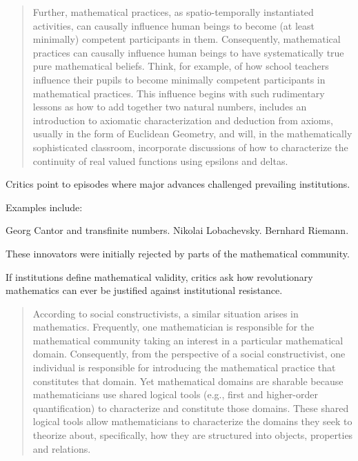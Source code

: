 \documentclass[11pt,a4paper]{article}
\begin{document}
\begin{quote}
Further, mathematical practices, as spatio-temporally instantiated activities, can causally influence human beings to become (at least minimally) competent participants in them. Consequently, mathematical practices can causally influence human beings to have systematically true pure mathematical beliefs. Think, for example, of how school teachers influence their pupils to become minimally competent participants in mathematical practices. This influence begins with such rudimentary lessons as how to add together two natural numbers, includes an introduction to axiomatic characterization and deduction from axioms, usually in the form of Euclidean Geometry, and will, in the mathematically sophisticated classroom, incorporate discussions of how to characterize the continuity of real valued functions using epsilons and deltas. \parencite[124]{Cole2008MathematicalDomains}
\end{quote}


Critics point to episodes where major advances challenged prevailing institutions.

Examples include:

Georg Cantor and transfinite numbers.
Nikolai Lobachevsky.
Bernhard Riemann.

These innovators were initially rejected by parts of the mathematical community.

If institutions define mathematical validity, critics ask how revolutionary mathematics can ever be justified against institutional resistance.

\begin{quote}
According to social constructivists, a similar situation arises in mathematics. Frequently, one mathematician is responsible for the mathematical community taking an interest in a particular mathematical domain. Consequently, from the perspective of a social constructivist, one individual is responsible for introducing the mathematical practice that constitutes that domain. Yet mathematical domains are sharable because mathematicians use shared logical tools (e.g., first and higher-order quantification) to characterize and constitute those domains. These shared logical tools allow mathematicians to characterize the domains they seek to theorize about, specifically, how they are structured into objects, properties and relations. \parencite[128]{Cole2008MathematicalDomains}
\end{quote}
\end{document}
